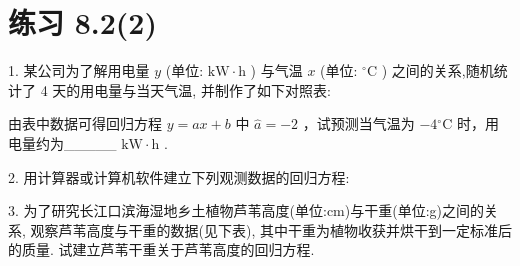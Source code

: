 \documentclass[10pt]{article}
\begin{document}
\section*{练习 8.2(2)}

1. 某公司为了解用电量 \(y\) (单位: \(\mathrm{{kW}} \cdot  \mathrm{h}\) ) 与气温 \(x\) (单位: \({}^{ \circ  }\mathrm{C}\) ) 之间的关系,随机统计了 4 天的用电量与当天气温, 并制作了如下对照表:

\begin{center}
\end{center}

由表中数据可得回归方程 \(y = {ax} + b\) 中 \(\widehat{a} =  - 2\) ，试预测当气温为 \(- 4{}^{ \circ  }\mathrm{C}\) 时，用电量约为\_\_\_\_\_ \(\mathrm{{kW}} \cdot  \mathrm{h}\) .

2. 用计算器或计算机软件建立下列观测数据的回归方程:

\begin{center}
\end{center}

3. 为了研究长江口滨海湿地乡土植物芦苇高度(单位:cm)与干重(单位:g)之间的关系, 观察芦苇高度与干重的数据(见下表), 其中干重为植物收获并烘干到一定标准后的质量. 试建立芦苇干重关于芦苇高度的回归方程.
\end{document}
